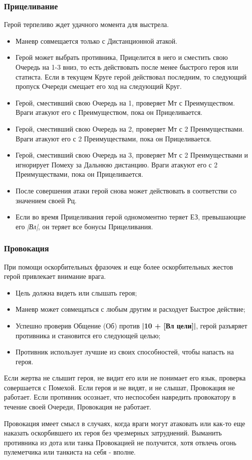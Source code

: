 \subsubsection{Прицеливание}
Герой терпеливо ждет удачного момента для выстрела.
\begin{itemize}
  \item Маневр совмещается только с Дистанционной атакой.
  \item Герой может выбрать противника, Прицелится в него и сместить свою Очередь на 1-3 вниз, то есть действовать после менее быстрого героя или статиста. Если в текущем Круге герой действовал последним, то следующий пропуск Очереди смещает его ход на следующий Круг.
  \item Герой, сместивший свою Очередь на 1, проверяет Мт с Преимуществом. Враги атакуют его с Преимуществом, пока он Прицеливается.
  \item Герой, сместивший свою Очередь на 2, проверяет Мт с 2 Преимуществами. Враги атакуют его с 2 Преимуществами, пока он Прицеливается.
  \item Герой, сместивший свою Очередь на 3, проверяет Мт с 2 Преимуществами и игнорирует Помеху за Дальнюю дистанцию. Враги атакуют его с 2 Преимуществами, пока он Прицеливается.
  \item После совершения атаки герой снова может действовать в соответстви со значением своей Рц.
  \item Если во время Прицеливания герой одномоментно теряет ЕЗ, превышающие его \textit{|Вл|}, он  теряет все бонусы Прицеливания. 
\end{itemize}

\subsubsection{Провокация}
При помощи оскорбительных фразочек и еще более оскорбительных жестов герой привлекает внимание врага.
\begin{itemize}
  \item Цель должна видеть или слышать героя;
  \item Маневр может совмещаться с любым другим и расходует Быстрое действие;
  \item Успешно проверив Общение (Об) против \textbf{|10 + [Вл цели]|}, герой разъяряет противника и становится его следующей целью;
  \item Противник использует лучшие из своих способностей, чтобы напасть на героя. 
\end{itemize}
Если жертва не слышит героя, не видит его или не понимает его язык, проверка совершается с Помехой. Если героя и не видят, и не слышат, Провокация не работает.
\newline Если противник осознает, что неспособен навредить провокатору в течение своей Очереди, Провокация не работает.
\begin{tcolorbox}
  Провокация имеет смысл в случаях, когда враги могут атаковать или как-то еще наказать оскорбившего их героя без чрезмерных затруднений. Выманить противника из дота или танка Провокацией не получится, хотя отвлечь огонь пулеметчика или танкиста на себя - вполне.
\end{tcolorbox}

